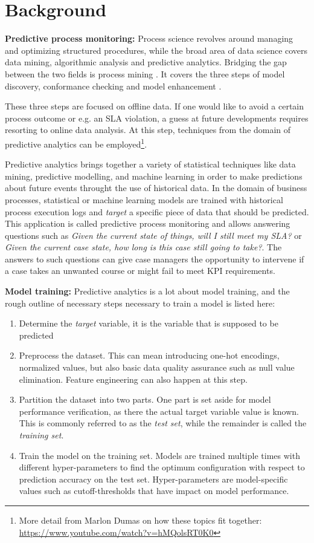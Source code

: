 \documentclass[%
	paper=A4,
	twoside=false,				%
	openright,					%
	parskip=full,				%
	chapterprefix=true,			%
	11pt,						%
	headings=normal,			%
	bibliography=totoc,			%
	listof=totoc,				%
	titlepage=on,				%
	captions=tableabove,		%
	draft=false,				%
]{scrreprt}
\begin{document}
\section*{Background}
\textbf{Predictive process monitoring:}
Process science revolves around managing and optimizing structured procedures, while the broad area of data science covers data mining, algorithmic analysis and predictive analytics. 
Bridging the gap between the two fields is process mining \cite[p.18]{Aalst16}.
It covers the three steps of model discovery, conformance checking and model enhancement \cite{Aalst16}.

These three steps are focused on offline data.
If one would like to avoid a certain process outcome  or e.g. an SLA violation, a guess at future developments requires resorting to online data analysis.
At this step, techniques from the domain of predictive analytics can be employed\footnote{More detail from Marlon Dumas on how these topics fit together: \url{https://www.youtube.com/watch?v=hMQolsRT0K0}}.

Predictive analytics brings together a variety of statistical techniques like data mining, predictive modelling, and machine learning in order to make predictions about future events throught the use of historical data.
In the domain of business processes, statistical or machine learning models are trained with historical process execution logs and \textit{target} a specific piece of data that should be predicted.
This application is called predictive process monitoring and allows answering questions such as \textit{Given the current state of things, will I still meet my SLA?} or \textit{Given the current case state, how long is this case still going to take?}.
The answers to such questions can give case managers the opportunity to intervene if a case takes an unwanted course or might fail to meet KPI requirements.

\textbf{Model training:}
Predictive analytics is a lot about model training, and the rough outline of necessary steps necessary to train a model is listed here:
\begin{enumerate}
    \item Determine the \textit{target} variable, it is the variable that is supposed to be predicted
    \item Preprocess the dataset. This can mean introducing one-hot encodings, normalized values, but also basic data quality assurance such as null value elimination. Feature engineering can also happen at this step.
    \item Partition the dataset into two parts. One part is set aside for model performance verification, as there the actual target variable value is known. This is commonly referred to as the \textit{test set}, while the remainder is called the \textit{training set}.
    \item Train the model on the training set. Models are trained multiple times with different hyper-parameters to find the optimum configuration with respect to prediction accuracy on the test set. Hyper-parameters are model-specific values such as cutoff-thresholds that have impact on model performance.
\end{enumerate}
\end{document}
